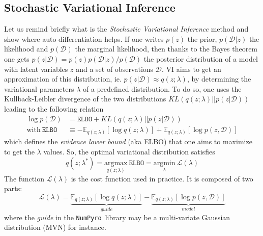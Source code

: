 \documentclass[twocolumn,twocolappendix,nofootinbib,iop]{openjournal}
\newcommand{\numpyro}{\texttt{NumPyro}}
\begin{document}
\subsection{Stochastic Variational Inference}
\label{sec-SVI}
%
Let us remind briefly what is the \textit{Stochastic Variational Inference} method \citep{10.5555/2567709.2502622, 8588399} and show where auto-differentiation helps. If one  writes $p(z)$ the prior, $p(\mathcal{D}|z)$ the likelihood and $p(\mathcal{D})$ the marginal likelihood, then thanks to the  Bayes theorem one gets $p(z|\mathcal{D})=p(z)p(\mathcal{D}|z)/p(\mathcal{D})$ the posterior distribution of a model with latent variables $z$ and a set of observations $\mathcal{D}$. VI aims to get an approximation of this distribution, ie. $p(z|\mathcal{D}) \approx q(z;\lambda)$, by determining the variational parameters $\lambda$ of a predefined distribution. To do so, one uses the Kullback-Leibler divergence of the two distributions $KL(q(z;\lambda)||p(z|\mathcal{D}))$ leading to the following relation
\begin{align}
\log p(\mathcal{D}) &= \mathtt{ELBO} +  KL(q(z;\lambda)||p(z|\mathcal{D})) \label{eq-ELBO} \\
\mathrm{with} \ \mathtt{ELBO} &\equiv -\mathbb{E}_{q(z;\lambda)}\left[ \log q(z;\lambda)\right] + \mathbb{E}_{q(z;\lambda)}\left[ \log p(z,\mathcal{D}) \right] 
\end{align}
which defines the \textit{evidence lower bound} (aka ELBO) that one aims to maximize to get the $\lambda$ values. So, the optimal variational distribution satisfies
\begin{equation}
q(z;\lambda^\ast) = \underset{q(z;\lambda)}{\mathrm{argmax}}\  \mathtt{ELBO} = 
\underset{\lambda}{\mathrm{argmin}}\ \mathcal{L}(\lambda)
\end{equation}
The function $\mathcal{L}(\lambda)$ is the cost function used in practice. It is composed of two parts:
\begin{equation}
\mathcal{L}(\lambda) = \underbrace{\mathbb{E}_{q(z;\lambda)}\left[ \log q(z;\lambda)\right]}_{guide} - \underbrace{\mathbb{E}_{q(z;\lambda)}\left[ \log p(z,\mathcal{D}) \right]}_{model}
\label{eq-loss-svi-1}
\end{equation}
where the \textit{guide} in the \numpyro\ library may be a multi-variate Gaussian distribution (MVN) for instance.
\end{document}
